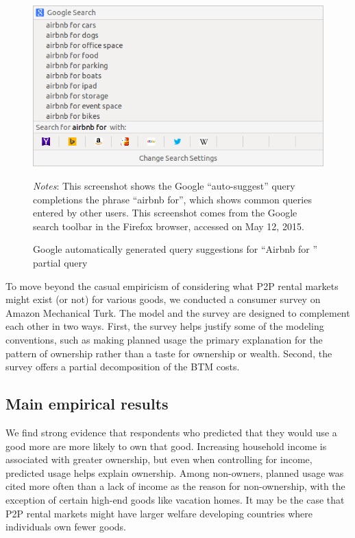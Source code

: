 \documentclass[11pt]{article}
\begin{document}
\begin{figure}
\centering 
\caption{Google automatically generated query suggestions for ``Airbnb for '' partial query}
\label{fig:auto} 
\begin{minipage}{0.70 \linewidth}
  \includegraphics[width = \linewidth]{./images/airbnb_for_x.png} \\
  \begin{footnotesize}
  \emph{Notes}: This screenshot shows the Google ``auto-suggest'' query completions the phrase ``airbnb for'', which shows common queries entered by other users.
  This screenshot comes from the Google search toolbar in the Firefox browser, accessed on May 12, 2015.
  \end{footnotesize}
\end{minipage}
\end{figure} 

To move beyond the casual empiricism of considering what P2P rental markets might exist (or not) for various goods, we conducted a consumer survey on Amazon Mechanical Turk. 
The model and the survey are designed to complement each other in two ways. 
First, the survey helps justify some of the modeling conventions, such as making planned usage the primary explanation for the pattern of ownership rather than a taste for ownership or wealth. 
Second, the survey offers a partial decomposition of the BTM costs. 

\subsection{Main empirical results}
We find strong evidence that respondents who predicted that they would use a good more are more likely to own that good.
Increasing household income is associated with greater ownership, but even when controlling for income, predicted usage helps explain ownership. 
Among non-owners, planned usage was cited more often than a lack of income as the reason for non-ownership, with the exception of certain high-end goods like vacation homes.
It may be the case that P2P rental markets might have larger welfare developing countries where individuals own fewer goods. 
\end{document}
